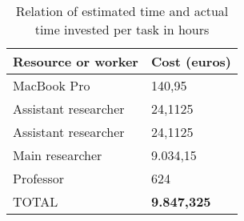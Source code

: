 		\begin{table}[H]
		\begin{center}
			\begin{tabular}{|| m{10em} | m{7em} ||}
				\hline
				\textbf{Resource or worker} & \textbf{Cost (euros)} \\
				\hline\hline
				MacBook Pro & 140,95  \\
				\hline
				Assistant researcher & 24,1125 \\
				\hline
				Assistant researcher & 24,1125 \\
				\hline
				Main researcher & 9.034,15 \\
				\hline
				Professor & 624 \\
				\hline
				TOTAL & \textbf{9.847,325} \\
				\hline
			\end{tabular}
		\end{center}
		\caption{Relation of estimated time and actual time invested  per task in hours}
		\label{table:15}
	\end{table}
	

